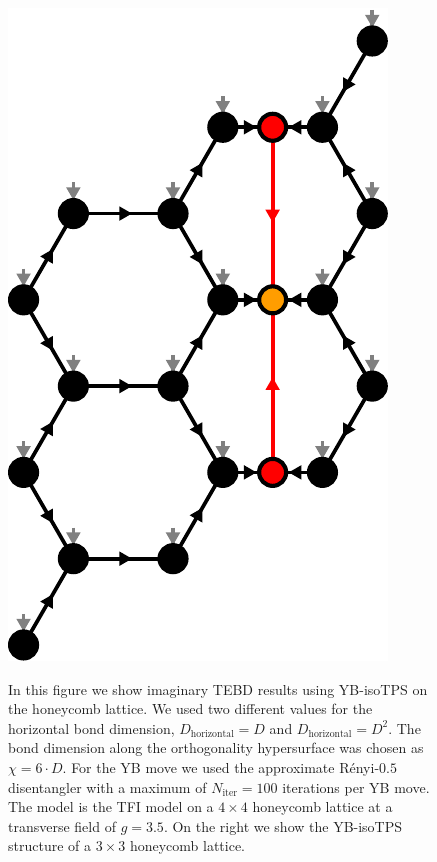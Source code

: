 \begin{figure}
\begin{minipage}{1.0\textwidth}
%
		\quad\quad
		\raisebox{15pt}
		{%
			\includegraphics[scale=0.5]{figures/tikz/TFI/hexagonal_lattice/hexagonal_lattice_structure.pdf}
		}
	\end{minipage}
	\caption{In this figure we show imaginary TEBD results using YB-isoTPS on the honeycomb lattice. We used two different values for the horizontal bond dimension, $D_\text{horizontal} = D$ and $D_\text{horizontal} = D^2$. The bond dimension along the orthogonality hypersurface was chosen as $\chi = 6\cdot D$. For the YB move we used the approximate Rényi-$0.5$ disentangler with a maximum of $N_\text{iter} = 100$ iterations per YB move. The model is the TFI model on a $4\times 4$ honeycomb lattice at a transverse field of $g = 3.5$. On the right we show the YB-isoTPS structure of a $3\times 3$ honeycomb lattice.}
	\label{fig:tfi_gs_energy_vs_dtau_honeycomb}
\end{figure}